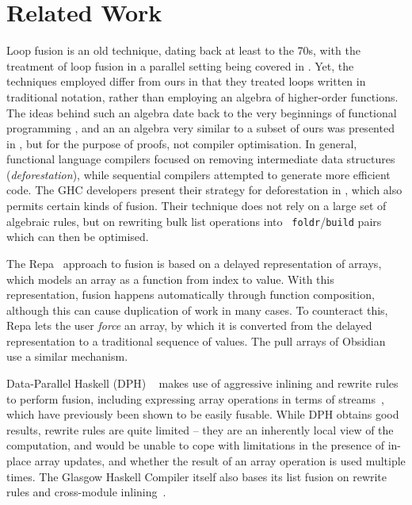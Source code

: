 \documentclass{sigplanconf}  %
\begin{document}
\section{Related Work}
\label{sec:RelWork}

Loop fusion is an old technique, dating back at least to the
70s\cite{cheatham1977programming}, with the treatment of loop fusion
in a parallel setting being covered in \cite{midki1990issues}.  Yet,
the techniques employed differ from ours in that they treated loops
written in traditional notation, rather than employing an algebra of
higher-order functions.  The ideas behind such an algebra date back to
the very beginnings of functional programming
\cite{Backus:1978:PLV:359576.359579}, and an an algebra very similar
to a subset of ours was presented in \cite{bird1989algebraic}, but for
the purpose of proofs, not compiler optimisation.  In general,
functional language compilers focused on removing intermediate data
structures ({\em deforestation}), while sequential compilers attempted
to generate more efficient code.  The GHC developers present their
strategy for deforestation in \cite{gill1993short}, which also permits
certain kinds of fusion.  Their technique does not rely on a large set
of algebraic rules, but on rewriting bulk list operations into {\tt
  foldr}/{\tt build} pairs which can then be optimised.

The Repa~\cite{keller2010regular} approach to fusion is based on a
delayed representation of arrays, which models an array as a function
from index to value.  With this representation, fusion happens
automatically through function composition, although this can cause
duplication of work in many cases.  To counteract this, Repa lets the
user {\em force} an array, by which it is converted from the
delayed representation to a traditional sequence of values.  The pull
arrays of Obsidian~\cite{claessen2012expressive} use a similar
mechanism.

Data-Parallel Haskell (DPH) ~\cite{chakravarty2007data} makes use of
aggressive inlining and rewrite rules to perform fusion, including
expressing array operations in terms of
streams~\cite{coutts2007rewriting}, which have previously been shown
to be easily fusable.  While DPH obtains good results, rewrite rules
are quite limited -- they are an inherently local view of the
computation, and would be unable to cope with limitations in the
presence of in-place array updates, and whether the result of an array
operation is used multiple times.  The Glasgow Haskell Compiler itself
also bases its list fusion on rewrite rules and cross-module
inlining~\cite{jones2001playing}.
\end{document}
